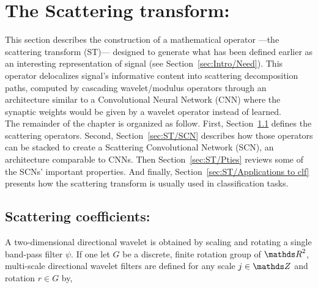 \documentclass[a4paper,11pt]{report}
\begin{document}
    
\chapter{The Scattering transform:}
  \label{chap:ST}
 
	This section describes the construction of a mathematical operator ---the scattering transform (ST)--- designed to generate what has been defined earlier as an interesting representation of signal (see Section~\ref{sec:Intro/Need}). This operator delocalizes signal's informative content into scattering decomposition paths, computed by cascading wavelet/modulus operators through an architecture similar to a Convolutional Neural Network (CNN) where the synaptic weights would be given by a wavelet operator instead of learned.\\ 
	
	The remainder of the chapter is organized as follow. First, Section~\ref{sec:ST/Scattering coefficients} defines the scattering operators. Second, Section~\ref{sec:ST/SCN} describes how those operators can be stacked to create a Scattering Convolutional Network (SCN), an architecture comparable to CNNs. Then Section~\ref{sec:ST/Pties} reviews some of the SCNs' important properties. And finally, Section~\ref{sec:ST/Applications to clf} presents how the scattering transform is usually used in classification tasks.
	      
		\section{Scattering coefficients:}
			\label{sec:ST/Scattering coefficients}

			A two-dimensional directional wavelet is obtained by scaling and rotating a single band-pass filter $\psi$. If one let $G$ be a discrete, finite rotation group of $\dsR^{2}$, multi-scale directional wavelet filters are defined for any scale $j \in \dsZ$ and rotation $r \in G$ by,
      
\end{document}
